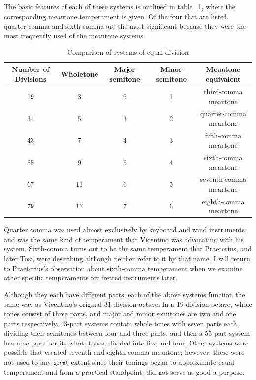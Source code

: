 The basic features of each of these systems is outlined in table
~\ref{table:equalDivision}, where the corresponding meantone temperament is given.  Of
the four that are listed, quarter-comma and sixth-comma are the most significant
because they were the most frequently used of the meantone systems.
\begin{table}[h!]
  \begin{center}
  \scalebox{0.7}
  {
    \begin{tabular}{ c c c c c}
      Number of Divisions & Wholetone & Major semitone & Minor semitone & Meantone equivalent \\
      \hline
      19 & 3 & 2 & 1 & third-comma meantone \\
      31 & 5 & 3 & 2 & quarter-comma meantone \\
      43 & 7 & 4 & 3 & fifth-comma meantone \\
      55 & 9 & 5 & 4 & sixth-comma meantone \\
      67 & 11 & 6 & 5 & seventh-comma meantone \\
      79 & 13 & 7 & 6 & eighth-comma meantone \\
    \end{tabular}
  }
  \end{center}
  \caption{Comparison of systems of equal division}
  \label{table:equalDivision}
\end{table}
Quarter comma was used almost exclusively by keyboard and wind instruments, and was the
same kind of temperament that Vicentino was advocating with his system. Sixth-comma turns
out to be the same temperament that Praetorius, and later Tosi, were describing although
neither refer to it by that name.  I will return to Praetorius's observation about
sixth-comma temperament when we examine other specific temperaments for fretted
instruments later.

Although they each have different parts, each of the above systems function the same way
as Vicentino's original 31-division octave. In a 19-division octave, whole tones consist
of three parts, and major and minor semitones are two and one parts respectively.  43-part
systems contain whole tones with seven parts each, dividing their semitones between four
and three parts, and then a 55-part system has nine parts for its whole tones, divided
into five and four.  Other systems were possible that created seventh and eighth comma
meantone; however, these were not used to any great extent since their tunings began to
approximate equal temperament and from a practical standpoint, did not serve as good a
purpose.

